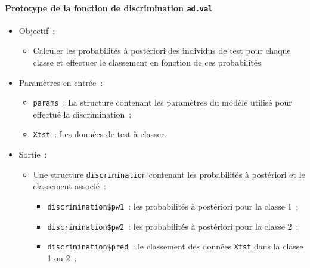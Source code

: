 \documentclass[a4paper,10pt]{report}
\begin{document}
\paragraph{Prototype de la fonction de discrimination \texttt{ad.val}}
\begin{itemize}
	\item Objectif~:
	\begin{itemize}
		\item Calculer les probabilités à postériori des individus de test pour chaque classe et effectuer le classement en fonction de ces probabilités.
	\end{itemize}
	
	\item Paramètres en entrée~:
	\begin{itemize}
		\item \texttt{params}~: La structure contenant les paramètres du modèle utilisé pour effectué la discrimination~;
		\item \texttt{Xtst}~: Les données de test à classer.
	\end{itemize}
	
	\item Sortie~:
	\begin{itemize}
		\item Une structure \texttt{discrimination} contenant les probabilités à postériori et le classement associé~:
		\begin{itemize}
			\item \texttt{discrimination\$pw1}~: les probabilités à postériori pour la classe 1~;
			\item \texttt{discrimination\$pw2}~: les probabilités à postériori pour la classe 2~;
			\item \texttt{discrimination\$pred}~: le classement des données \texttt{Xtst} dans la classe 1 ou 2~;
		\end{itemize}
	\end{itemize}
	

\end{itemize}
\end{document}
